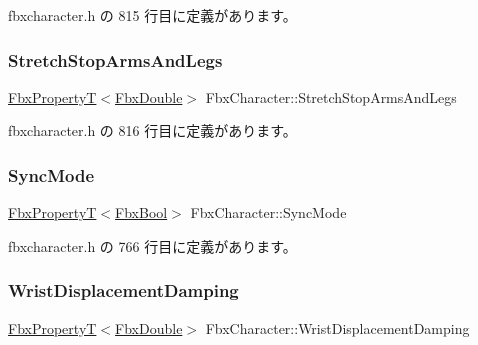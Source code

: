  fbxcharacter.\+h の 815 行目に定義があります。

\mbox{\label{class_fbx_character_a123c91c264ee326a8ae492c6f2aa5b7c}} 
\subsubsection{\texorpdfstring{Stretch\+Stop\+Arms\+And\+Legs}{StretchStopArmsAndLegs}}
{\footnotesize\ttfamily \hyperlink{class_fbx_property_t}{Fbx\+PropertyT}$<$\hyperlink{fbxtypes_8h_a171e72a1c46fc15c1a6c9c31948c1c5b}{Fbx\+Double}$>$ Fbx\+Character\+::\+Stretch\+Stop\+Arms\+And\+Legs}



 fbxcharacter.\+h の 816 行目に定義があります。

\mbox{\label{class_fbx_character_abb7013de6c9f5f810e869f0111b1912c}} 
\subsubsection{\texorpdfstring{Sync\+Mode}{SyncMode}}
{\footnotesize\ttfamily \hyperlink{class_fbx_property_t}{Fbx\+PropertyT}$<$\hyperlink{fbxtypes_8h_a92e0562b2fe33e76a242f498b362262e}{Fbx\+Bool}$>$ Fbx\+Character\+::\+Sync\+Mode}



 fbxcharacter.\+h の 766 行目に定義があります。

\mbox{\label{class_fbx_character_a5bfe39a4704ca85d5bb599dfbd8aac26}} 
\subsubsection{\texorpdfstring{Wrist\+Displacement\+Damping}{WristDisplacementDamping}}
{\footnotesize\ttfamily \hyperlink{class_fbx_property_t}{Fbx\+PropertyT}$<$\hyperlink{fbxtypes_8h_a171e72a1c46fc15c1a6c9c31948c1c5b}{Fbx\+Double}$>$ Fbx\+Character\+::\+Wrist\+Displacement\+Damping}



